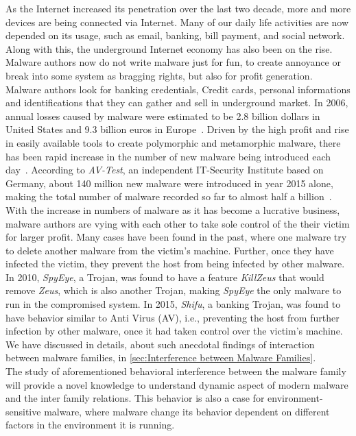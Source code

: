 As the Internet increased its penetration over the last two decade, more and more devices are being connected via Internet.
Many of our daily life activities are now depended on its usage, such as email, banking, bill payment, and social network.
Along with this, the underground Internet economy has also been on the rise.
Malware authors now do not write malware just for fun, to create annoyance or break into some system as bragging rights, but also for profit generation.
Malware authors look for banking credentials, Credit cards, personal informations and identifications that they can gather and sell in underground market.
In 2006, annual losses caused by malware were estimated to be 2.8 billion dollars in United States and 9.3 billion euros in Europe~\cite[]{moore2009economics}.
Driven by the high profit and rise in easily available tools to create polymorphic and metamorphic malware, there has been rapid increase in the number of new malware being introduced each day~\cite[]{tian}.
According to \emph{AV-Test}, an independent IT-Security Institute based on Germany, about 140 million new malware were introduced in year 2015 alone, making the total number of malware recorded so far to almost half a billion~\cite[]{avtest}.
\\
With the increase in numbers of malware as it has become a lucrative business, malware authors are vying with each other to take sole control of the their victim for larger profit.
Many cases have been found in the past, where one malware try to delete another malware from the victim's machine.
Further, once they have infected the victim, they prevent the host from being infected by other malware.
In 2010, \emph{SpyEye}, a Trojan, was found to have a feature \emph{KillZeus} that would remove \emph{Zeus}, which is also another Trojan, making \emph{SpyEye} the only malware to run in the compromised system.
In 2015, \emph{Shifu}, a banking Trojan, was found to have behavior similar to Anti Virus (AV), i.e., preventing the host from further infection by other malware, once it had taken control over the victim's machine.
We have discussed in details, about such anecdotal findings of interaction between malware families, in \autoref{sec:Interference between Malware Families}.\\
The study of aforementioned behavioral interference between the malware family will provide a novel knowledge to understand dynamic aspect of modern malware and the inter family relations.
This behavior is also a case for environment-sensitive malware, where malware change its behavior dependent on different factors in the environment it is running.
